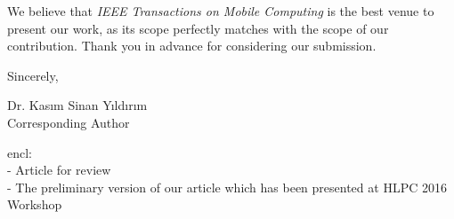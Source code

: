 \documentclass[11pt]{article}
\def\Who{Dr. Kas{\i}m Sinan Y{\i}ld{\i}r{\i}m}
\begin{document}
	We believe that \emph{IEEE Transactions on Mobile Computing} is 
	the best 
	venue to present our work, as its scope 
	perfectly matches with the scope of our contribution. Thank you in advance for 
	considering our submission.
	
	\vspace{0.3cm}
	
	Sincerely,
	
	\Who \\
	Corresponding Author
	
	encl: \\
	- Article for review \\
	- The preliminary version of our article which has been presented at HLPC 	
	2016 Workshop\\  
	
\end{document}
